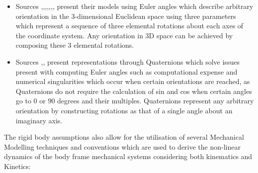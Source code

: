 \documentclass[12pt,a4paper,twoside]{report}
\begin{document}
				\begin{itemize}
					\item 
						Sources \cite{1},\cite{2},\cite{3},\cite{4},\cite{5},\cite{6},\cite{7},\cite{9} present their models using Euler angles which describe arbitrary orientation in the 3-dimensional Euclidean space using three parameters which represent a sequence of three elemental rotations about each axes of the coordinate system. Any orientation in 3D space can be achieved by composing these 3 elemental rotations.
					\item
						Sources \cite{1},\cite{8},\cite{16} present representations through Quaternions which solve issues present with computing Euler angles such as computational expense and numerical singularities which occur when certain orientations are reached, as Quaternions do not require the calculation of sin and cos when certain angles go to 0 or 90 degrees and their multiples. Quaternions represent any arbitrary orientation by constructing rotations as that of a single angle about an imaginary axis. 
				\end{itemize}
				\space
				The rigid body assumptions also allow for the utilisation of several Mechanical Modelling techniques and conventions which are used to derive the non-linear dynamics of the body frame mechanical systems considering both kinematics and Kinetics:
				
\end{document}
